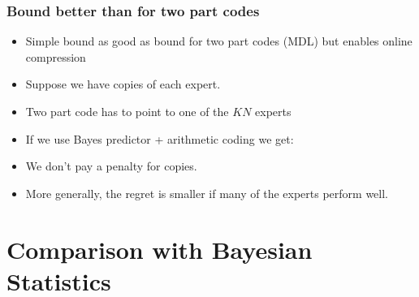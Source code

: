 \documentclass{beamer}
\begin{document}

\begin{frame}
\frametitle{Bound better than for two part codes}
\begin{itemize}
\item
Simple bound as good as bound for two part codes (MDL) 
but enables online compression
\item Suppose we have  copies of each expert.
\item Two part code has to point to one of the $KN$ experts
\item If we use Bayes predictor + arithmetic coding we get:
\item We don't pay a penalty for copies.
\item More generally, the regret is smaller if many of the experts perform well.
\end{itemize}
\end{frame}


\section{Comparison with Bayesian Statistics}
\end{document}

